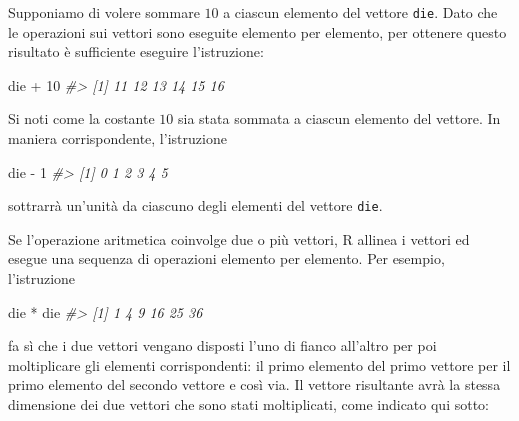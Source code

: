 \documentclass[
]{memoir}
\newenvironment{Shaded}{\begin{snugshade}}{\end{snugshade}}
\newcommand{\CommentTok}[1]{\textcolor[rgb]{0.56,0.35,0.01}{\textit{#1}}}
\newcommand{\DecValTok}[1]{\textcolor[rgb]{0.00,0.00,0.81}{#1}}
\newcommand{\NormalTok}[1]{#1}
\newcommand{\SpecialCharTok}[1]{\textcolor[rgb]{0.00,0.00,0.00}{#1}}
\theoremstyle{definition}
\theoremstyle{definition}
\theoremstyle{definition}
\theoremstyle{definition}
\theoremstyle{remark}
\begin{document}
Supponiamo di volere sommare \(10\) a ciascun elemento del vettore \texttt{die}.
Dato che le operazioni sui vettori sono eseguite elemento per elemento,
per ottenere questo risultato è sufficiente eseguire l'istruzione:

\begin{Shaded}
\begin{Highlighting}[]
\NormalTok{die }\SpecialCharTok{+} \DecValTok{10}
\CommentTok{\#\textgreater{} [1] 11 12 13 14 15 16}
\end{Highlighting}
\end{Shaded}

Si noti come la costante \(10\) sia stata sommata a ciascun elemento del
vettore. In maniera corrispondente, l'istruzione

\begin{Shaded}
\begin{Highlighting}[]
\NormalTok{die }\SpecialCharTok{{-}} \DecValTok{1}
\CommentTok{\#\textgreater{} [1] 0 1 2 3 4 5}
\end{Highlighting}
\end{Shaded}

sottrarrà un'unità da ciascuno degli elementi del vettore \texttt{die}.

Se l'operazione aritmetica coinvolge due o più vettori, R allinea i vettori ed esegue una sequenza di operazioni elemento per elemento. Per esempio, l'istruzione

\begin{Shaded}
\begin{Highlighting}[]
\NormalTok{die }\SpecialCharTok{*}\NormalTok{ die}
\CommentTok{\#\textgreater{} [1]  1  4  9 16 25 36}
\end{Highlighting}
\end{Shaded}

fa sì che i due vettori vengano disposti l'uno di fianco all'altro per poi moltiplicare gli elementi corrispondenti: il primo elemento del primo vettore per il primo elemento del secondo vettore e così via. Il vettore risultante avrà la stessa dimensione dei due vettori che sono stati moltiplicati, come indicato qui sotto:
\end{document}
